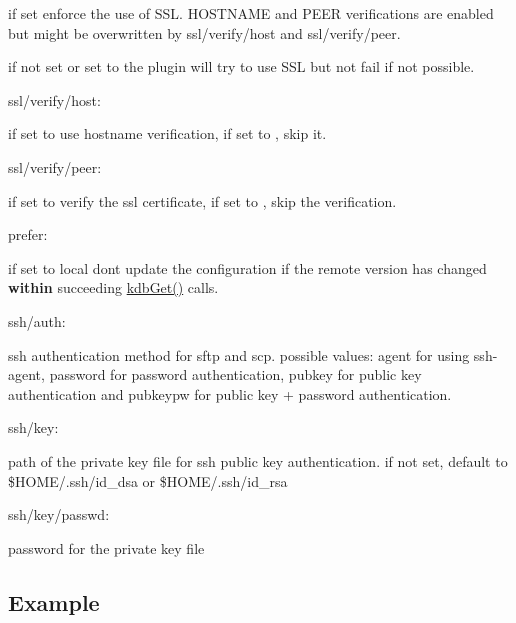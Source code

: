 \begin{DoxyItemize}
if set {} enforce the use of {\ttfamily S\+SL}. {\ttfamily H\+O\+S\+T\+N\+A\+ME} and {\ttfamily P\+E\+ER} verifications are enabled but might be overwritten by {\ttfamily ssl/verify/host} and {\ttfamily ssl/verify/peer}.

if not set or set to {} the plugin will try to use {\ttfamily S\+SL} but not fail if not possible.
\item {\ttfamily ssl/verify/host}\+:

if set to {} use hostname verification, if set to {}, skip it.
\item {\ttfamily ssl/verify/peer}\+:

if set to {} verify the ssl certificate, if set to {}, skip the verification.
\item {\ttfamily prefer}\+:

if set to {\ttfamily local} don\textquotesingle{}t update the configuration if the remote version has changed {\bfseries within} succeeding {\ttfamily \hyperlink{group__kdb_ga28e385fd9cb7ccfe0b2f1ed2f62453a1}{kdb\+Get()}} calls.
\item {\ttfamily ssh/auth}\+:

ssh authentication method for sftp and scp. possible values\+: {\ttfamily agent} for using {\ttfamily ssh-\/agent}, {\ttfamily password} for password authentication, {\ttfamily pubkey} for public key authentication and {\ttfamily pubkeypw} for public key + password authentication.
\item {\ttfamily ssh/key}\+:

path of the private key file for ssh public key authentication. if not set, default to {\ttfamily \$\+H\+O\+ME/.ssh/id\+\_\+dsa} or {\ttfamily \$\+H\+O\+ME/.ssh/id\+\_\+rsa}
\item {\ttfamily ssh/key/passwd}\+:

password for the private key file
\end{DoxyItemize}

\subsection*{Example}


